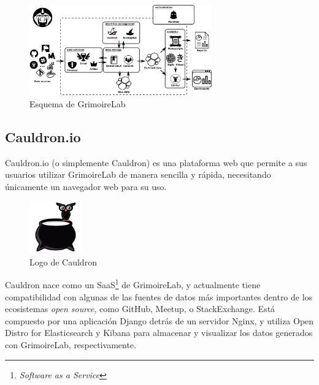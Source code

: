 \begin{figure}[ht]
    \centering
    \includegraphics[width=0.7\textwidth]{Figures/grimoirelab-schema}
    \decoRule
    \caption[GrimoireLab (Esquema)]{Esquema de GrimoireLab \emph{\parencite{Reference12}}}
    \label{fig:grimoirelab-schema}
\end{figure}

\subsection{Cauldron.io}

Cauldron.io (o simplemente Cauldron) es una plataforma web que permite a sus usuarios utilizar GrimoireLab de manera sencilla y rápida, necesitando únicamente un navegador web para su uso. \emph{\parencite{Reference13}}

\begin{figure}[ht]
    \centering
    \includegraphics[width=0.2\textwidth]{Figures/cauldron-logo}
    \decoRule
    \caption[Cauldron (Logo)]{Logo de Cauldron \emph{\parencite{Reference13}}}
    \label{fig:cauldron-logo}
\end{figure}

Cauldron nace como un SaaS\footnote{\emph{Software as a Service}} de GrimoireLab, y actualmente tiene compatibilidad con algunas de las fuentes de datos más importantes dentro de los ecosistemas \emph{open source}, como GitHub, Meetup, o StackExchange. Está compuesto por una aplicación Django detrás de un servidor Nginx, y utiliza Open Distro for Elasticsearch y Kibana para almacenar y visualizar los datos generados con GrimoireLab, respectivamente.

